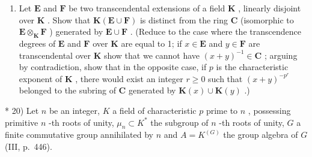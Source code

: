 \begin{enumerate}
\def\labelenumi{\arabic{enumi})}
\setcounter{enumi}{18}
\tightlist
\item
  Let \(\mathbf{E}\) and \(\mathbf{F}\) be two transcendental extensions of a field \(\mathbf{K}\) , linearly disjoint over \(\mathbf{K}\) . Show that \(\mathbf{K}(\mathbf{E} \cup \mathbf{F})\) is distinct from the ring \(\mathbf{C}\) (isomorphic to \(\mathbf{E} \otimes_{\mathbf{K}} \mathbf{F}\) ) generated by \(\mathbf{E} \cup \mathbf{F}\) . (Reduce to the case where the transcendence degrees of \(\mathbf{E}\) and \(\mathbf{F}\) over \(\mathbf{K}\) are equal to 1; if \(x \in \mathbf{E}\) and \(y \in \mathbf{F}\) are transcendental over \(\mathbf{K}\) show that we cannot have \((x + y)^{-1} \in \mathbf{C}\) ; arguing by contradiction, show that in the opposite case, if \(p\) is the characteristic exponent of \(\mathbf{K}\) , there would exist an integer \(r \geqslant 0\) such that \((x + y)^{-p^r}\) belonged to the subring of \(\mathbf{C}\) generated by \(\mathbf{K}(x) \cup \mathbf{K}(y)\) .)
\end{enumerate}

* 20) Let \(n\) be an integer, \(K\) a field of characteristic \(p\) prime to \(n\) , possessing primitive \(n\) -th roots of unity, \(\mu_n \subset K^*\) the subgroup of \(n\) -th roots of unity, \(G\) a finite commutative group annihilated by \(n\) and \(A = K^{(G)}\) the group algebra of \(G\) (III, p.~446).

